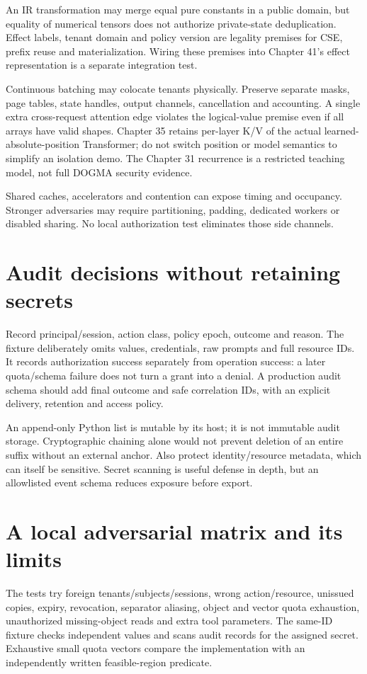 An IR transformation may merge equal pure constants in a public domain, but
equality of numerical tensors does not authorize private-state deduplication.
Effect labels, tenant domain and policy version are legality premises for CSE,
prefix reuse and materialization. Wiring these premises into
Chapter 41's effect representation is a separate integration test.

Continuous batching may colocate tenants physically. Preserve separate masks,
page tables, state handles, output channels, cancellation and accounting. A
single extra cross-request attention edge violates the logical-value premise
even if all arrays have valid shapes. Chapter 35 retains per-layer K/V of
the actual learned-absolute-position Transformer; do not switch position or
model semantics to simplify an isolation demo. The Chapter 31 recurrence is
a restricted teaching model, not full DOGMA security evidence.

Shared caches, accelerators and contention can expose timing and occupancy.
Stronger adversaries may require partitioning, padding, dedicated workers or
disabled sharing. No local authorization test eliminates those side channels.

\section{Audit decisions without retaining secrets}
\label{evod45:audit}
Record principal/session, action class, policy epoch, outcome and reason.
The fixture deliberately omits values, credentials, raw prompts and full
resource IDs. It records authorization success separately from operation
success: a later quota/schema failure does not turn a grant into a denial.
A production audit schema should add final outcome and safe correlation IDs,
with an explicit delivery, retention and access policy.

An append-only Python list is mutable by its host; it is not immutable audit
storage. Cryptographic chaining alone would not prevent deletion of an entire
suffix without an external anchor. Also protect identity/resource metadata,
which can itself be sensitive. Secret scanning is useful defense in depth,
but an allowlisted event schema reduces exposure before export.

\section{A local adversarial matrix and its limits}
\label{evod45:tests}
The tests try foreign tenants/subjects/sessions, wrong action/resource,
unissued copies, expiry, revocation, separator aliasing, object and vector
quota exhaustion, unauthorized missing-object reads and extra tool parameters.
The same-ID fixture checks independent values and scans audit records for
the assigned secret. Exhaustive small quota vectors compare the implementation
with an independently written feasible-region predicate.

